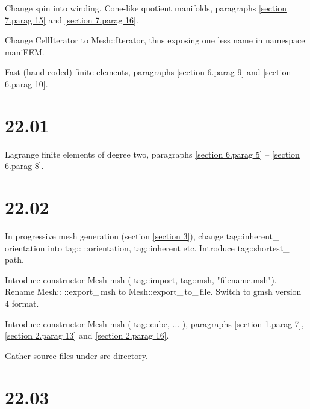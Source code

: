 \documentclass[a4paper,oneside]{scrbook}
\def\numb{}
\newcommand\azul[1]{\textcolor{nova}{#1}}
\newcommand\verm[1]{\textcolor{manif}{#1}}
\newcommand\verde[1]{\textcolor{string}{#1}}
\renewcommand\tt{\normalfont\ttfamily}
\begin{document}
\noindent Change {\small\tt spin} into {\small\tt winding}.
Cone-like quotient manifolds, paragraphs \ref{\numb section 7.\numb parag 15} and
\ref{\numb section 7.\numb parag 16}.

\noindent Change {\small\tt\verm{CellIterator}} to {\small\tt\verm{Mesh}::Iterator},
thus exposing one less name in {\small\tt namespace \verm{maniFEM}}.

\noindent Fast (hand-coded) finite elements, paragraphs \ref{\numb section 6.\numb parag 9}
and \ref{\numb section 6.\numb parag 10}.


\section*{22.01}

\noindent Lagrange finite elements of degree two, paragraphs \ref{\numb section 6.\numb parag 5}
-- \ref{\numb section 6.\numb parag 8}.


\section*{22.02}

\noindent In progressive mesh generation (section \ref{\numb section 3}), change
{\small\tt\textcolor{tag}{tag}::inherent\_\,orientation} into
{\small\tt\textcolor{tag}{tag}::} {\small\tt::orientation,} {\small\tt\textcolor{tag}{tag}::inherent} etc.
Introduce {\small\tt\textcolor{tag}{tag}::shortest\_\,path}.

\noindent Introduce constructor {\small\tt\verm{Mesh}} {\small\tt \azul{msh}} {\small\tt (}
{\small\tt\textcolor{tag}{tag}::import,} {\small\tt \textcolor{tag}{tag}::msh,}
{\small\tt\verde{"filename.msh"})}.
\noindent Rename {\small\tt\verm{Mesh}::} {\small\tt::export\_\,msh} to
{\small\tt\verm{Mesh}::export\_\,to\_\,file}.
Switch to {\small\tt gmsh} version 4 format.          

\noindent Introduce constructor {\small\tt\verm{Mesh}} {\small\tt \azul{msh}} {\small\tt (}
{\small\tt\textcolor{tag}{tag}::cube,} {\small\tt ...} {\small\tt )}, paragraphs
\ref{\numb section 1.\numb parag 7}, \ref{\numb section 2.\numb parag 13} and
\ref{\numb section 2.\numb parag 16}.

\noindent Gather source files under {\small\tt src} directory.


\section*{22.03}
\end{document}
